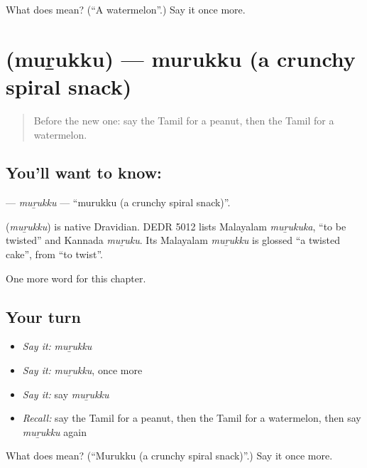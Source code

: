 \begin{tcolorbox}[breakable,colback=teal!4,colframe=teal!35!black,title={Before you move on}]
What does  mean? (\textquotedblleft{}A watermelon\textquotedblright{}.) Say it once more.
\end{tcolorbox}
\section[\texorpdfstring{\ta{முறுக்கு} (muṟukku)}{முறுக்கு (muṟukku)}]{ (muṟukku) — murukku (a crunchy spiral snack)}

\label{lesson:TA-C278-murukku}



\begin{quote}
Before the new one: say the Tamil for a peanut, then the Tamil for a watermelon.
\end{quote}

\subsection*{You'll want to know: }
\textbf{} — \emph{muṟukku} — \textquotedblleft{}murukku (a crunchy spiral snack)\textquotedblright{}.

\begin{cousinweb}
\textbf{} (\emph{muṟukku}) is native Dravidian. DEDR 5012 lists Malayalam \emph{muṟukuka}, \textquotedblleft{}to be twisted\textquotedblright{} and Kannada \emph{muṟuku}. Its Malayalam \emph{muṟukku} is glossed \textquotedblleft{}a twisted cake\textquotedblright{}, from \textquotedblleft{}to twist\textquotedblright{}.
\end{cousinweb}

\begin{grammarlens}[title={What you've built}]
One more word for this chapter.
\end{grammarlens}

\subsection*{Your turn}
\begin{itemize}
\raggedright
  \item \emph{Say it:} \emph{muṟukku}
  \item \emph{Say it:} \emph{muṟukku}, once more
  \item \emph{Say it:} say \emph{muṟukku}
  \item \emph{Recall:} say the Tamil for a peanut, then the Tamil for a watermelon, then say \emph{muṟukku} again
\end{itemize}

\begin{tcolorbox}[breakable,colback=teal!4,colframe=teal!35!black,title={Before you move on}]
What does  mean? (\textquotedblleft{}Murukku (a crunchy spiral snack)\textquotedblright{}.) Say it once more.
\end{tcolorbox}

